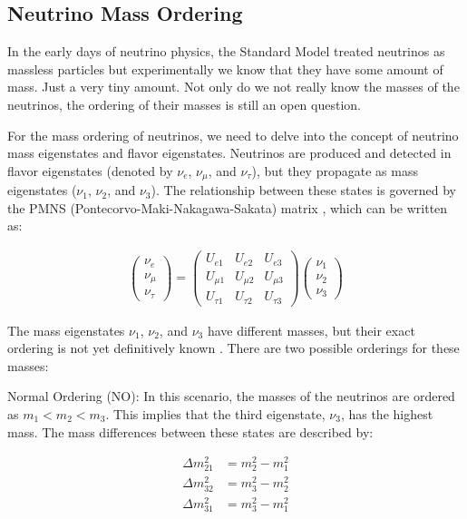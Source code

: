 \subsection{Neutrino Mass Ordering}

In the early days of neutrino physics, the Standard Model treated neutrinos as massless particles but experimentally we know that they have some amount of mass.
Just a very tiny amount.
Not only do we not really know the masses of the neutrinos, the ordering of their masses is still an open question.

For the mass ordering of neutrinos, we need to delve into the concept of neutrino mass eigenstates and flavor eigenstates.
Neutrinos are produced and detected in flavor eigenstates (denoted by $\nu_e$, $\nu_\mu$, and $\nu_\tau$), but they propagate as mass eigenstates ($\nu_1$, $\nu_2$, and $\nu_3$).
The relationship between these states is governed by the PMNS (Pontecorvo-Maki-Nakagawa-Sakata) matrix \cite{PMNS_matrix}, which can be written as:

\begin{align}
  \begin{pmatrix}
    \nu_e \\
    \nu_\mu \\
    \nu_\tau
  \end{pmatrix}
  =
  \begin{pmatrix}
    U_{e1} & U_{e2} & U_{e3} \\
    U_{\mu1} & U_{\mu2} & U_{\mu3} \\
    U_{\tau1} & U_{\tau2} & U_{\tau3}
  \end{pmatrix}
  \begin{pmatrix}
    \nu_1 \\
    \nu_2 \\
    \nu_3
  \end{pmatrix}
\end{align}

The mass eigenstates $\nu_1$, $\nu_2$, and $\nu_3$ have different masses, but their exact ordering is not yet definitively known \cite{De_Angelis_Pimenta_2018}.
There are two possible orderings for these masses:

Normal Ordering (NO): In this scenario, the masses of the neutrinos are ordered as \( m_1 < m_2 < m_3 \).
This implies that the third eigenstate, $\nu_3$, has the highest mass.
The mass differences between these states are described by:

\begin{align}
  \Delta m_{21}^2 &= m_2^2 - m_1^2 \\
  \Delta m_{32}^2 &= m_3^2 - m_2^2 \\
  \Delta m_{31}^2 &= m_3^2 - m_1^2
\end{align}

